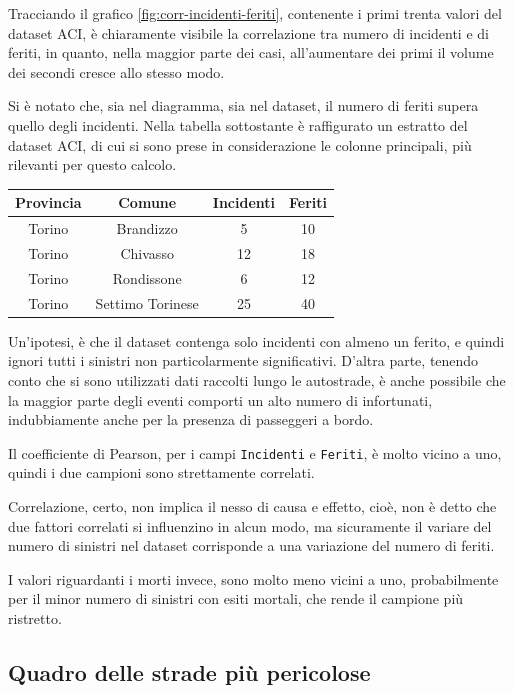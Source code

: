 \documentclass[a4paper]{report}
\newcommand{\columnstyle}[1]{\texttt{#1}}
\begin{document}
Tracciando il grafico \ref{fig:corr-incidenti-feriti}, contenente i primi trenta valori 
del dataset ACI, è chiaramente visibile la correlazione tra 
numero di incidenti e di feriti, in quanto, nella maggior parte dei casi, 
all'aumentare dei primi il volume dei secondi cresce allo stesso modo. 

Si è notato che, sia nel diagramma, sia nel dataset, il numero di feriti supera quello 
degli incidenti. 
Nella tabella sottostante è raffigurato un estratto del dataset ACI, 
di cui si sono prese in considerazione le colonne principali, più 
rilevanti per questo calcolo. 

\begin{center}
    \def\arraystretch{1.5}%
    \begin{tabular}{ |c|c|c|c| } 
    \hline
    Provincia & Comune & Incidenti & Feriti \\ 
    \hline
    \rowcolor{TableGray}
    Torino & Brandizzo & 5 & 10\\
    Torino & Chivasso & 12 & 18\\
    \rowcolor{TableGray}
    Torino & Rondissone & 6 & 12\\
    Torino & Settimo Torinese & 25 & 40\\
    \hline
    \end{tabular}
\end{center}

Un'ipotesi, è che il dataset contenga solo incidenti con almeno un ferito, 
e quindi ignori tutti i sinistri non particolarmente significativi. 
D'altra parte, tenendo conto che si sono utilizzati dati raccolti lungo 
le autostrade, è anche possibile che la maggior parte degli eventi comporti 
un alto numero di infortunati, indubbiamente anche per la presenza di passeggeri a bordo.

Il coefficiente di Pearson, per i campi \columnstyle{Incidenti} e \columnstyle{Feriti}, 
è molto vicino a uno, quindi i due campioni sono strettamente correlati. 

Correlazione, certo, non implica il nesso di causa e effetto, 
cioè, non è detto che due fattori correlati si influenzino in alcun modo,
ma sicuramente il variare del numero di sinistri nel dataset corrisponde 
a una variazione del numero di feriti.

I valori riguardanti i morti invece, sono molto meno vicini a uno, probabilmente 
per il minor numero di sinistri con esiti mortali, che rende il campione più ristretto. 

\subsection{Quadro delle strade più pericolose}
\end{document}
